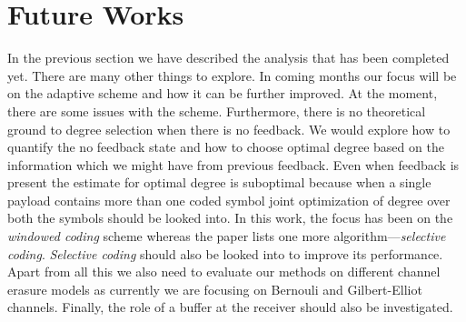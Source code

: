 \section{Future Works}
In the previous section we have described the analysis that has been completed yet. There are many other things to explore. In coming months our focus will be on the adaptive scheme and how it can be further improved. At the moment, there are some issues with the scheme. Furthermore, there is no theoretical ground to degree selection when there is no feedback. We would explore how to quantify the no feedback state and how to choose optimal degree based on the information which we might have from previous feedback. Even when feedback is present the estimate for optimal degree is suboptimal because when a single payload contains more than one coded symbol joint optimization of degree over both the symbols should be looked into. In this work, the focus has been on the \textit{windowed coding} scheme whereas the paper \cite{borkotokyicc} lists one more algorithm---\textit{selective coding}. \textit{Selective coding} should also be looked into to improve its performance. Apart from all this we also need to evaluate our methods on different channel erasure models as currently we are focusing on Bernouli and Gilbert-Elliot channels. Finally, the role of a buffer at the receiver should also be investigated.


